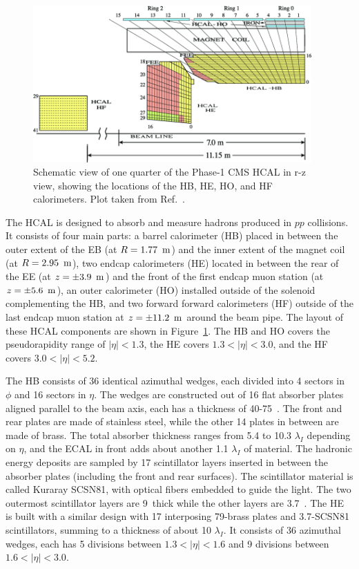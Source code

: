\begin{figure}[!htb]
    \centering
    \captionsetup{justification=justified}
    \includegraphics[width=0.95\textwidth]{pics/LHC_CMS/HCAL.png}
    \caption{Schematic view of one quarter of the Phase-1 CMS HCAL in r-z view,
             showing the locations of the HB, HE, HO, and HF calorimeters.
             Plot taken from Ref.~\cite{Mans:1481837}.}
    \label{fig:cms_hcal}
\end{figure}

The HCAL is designed to absorb and measure hadrons produced in $pp$ collisions.
It consists of four main parts: a barrel calorimeter (HB) placed in between the outer extent of the EB (at $R = 1.77~\meter$) and the inner extent of the magnet coil (at $R = 2.95~\meter$),
two endcap calorimeters (HE) located in between the rear of the EE (at $z = \pm 3.9~\meter$) and the front of the first endcap muon station (at $z = \pm 5.6~\meter$),
an outer calorimeter (HO) installed outside of the solenoid complementing the HB,
and two forward forward calorimeters (HF) outside of the last endcap muon station at $z = \pm 11.2~\meter$ around the beam pipe.
The layout of these HCAL components are shown in Figure~\ref{fig:cms_hcal}.
The HB and HO covers the pseudorapidity range of $|\eta| < 1.3$, the HE covers $1.3 < |\eta| < 3.0$,
and the HF covers $3.0 < |\eta| < 5.2$.

The HB consists of 36 identical azimuthal wedges, each divided into 4 sectors in $\phi$ and 16 sectors in $\eta$.
The wedges are constructed out of 16 flat absorber plates aligned parallel to the beam axis, each has a thickness of 40-75~\mm.
The front and rear plates are made of stainless steel, while the other 14 plates in between are made of brass.
The total absorber thickness ranges from 5.4 to 10.3 $\lambda_{I}$ depending on $\eta$, and the ECAL in front adds about another 1.1 $\lambda_{I}$ of material.
The hadronic energy deposits are sampled by 17 scintillator layers inserted in between the absorber plates (including the front and rear surfaces).
The scintillator material is called Kuraray SCSN81, with optical fibers embedded to guide the light.
The two outermost scintillator layers are 9~\mm thick while the other layers are 3.7~\mm.
The HE is built with a similar design with 17 interposing 79-\mm brass plates and 3.7-\mm SCSN81 scintillators, summing to a thickness of about 10 $\lambda_{I}$.
It consists of 36 azimuthal wedges, each has 5 divisions between $1.3 < |\eta| < 1.6$ and 9 divisions between $1.6 < |\eta| < 3.0$.


